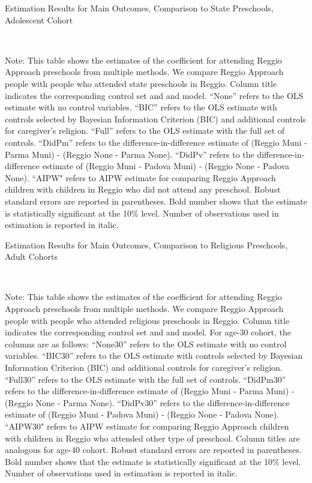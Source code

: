\begin{table}[H] \caption{Estimation Results for Main Outcomes, Comparison to State Preschools, Adolescent Cohort} \label{ols-M-adol-reg-stat}
\scalebox{0.8}{}
\vspace{1ex} \\
\footnotesize\raggedright{Note: This table shows the estimates of the coefficient for attending Reggio Approach preschools from multiple methods. We compare Reggio Approach people with people who attended state preschools in Reggio. Column title indicates the corresponding control set and and model. ``None'' refers to the OLS estimate with no control variables. ``BIC'' refers to the OLS estimate with controls selected by Bayesian Information Criterion (BIC) and additional controls for caregiver's religion. ``Full'' refers to the OLS estimate with the full set of controls. ``DidPm'' refers to the difference-in-difference estimate of (Reggio Muni - Parma Muni) - (Reggio None - Parma None). ``DidPv'' refers to the difference-in-difference estimate of (Reggio Muni - Padova Muni) - (Reggio None - Padova None).  ``AIPW" refers to AIPW estimate for comparing Reggio Approach children with children in Reggio who did not attend any preschool. Robust standard errors are reported in parentheses. Bold number shows that the estimate is statistically significant at the 10\% level. Number of observations used in estimation is reported in italic.}
\end{table}




\begin{table}[H] \caption{Estimation Results for Main Outcomes, Comparison to Religious Preschools, Adult Cohorts} \label{ols-M-adult-reg-reli}
\scalebox{0.75}{}
\vspace{1ex} \\
\footnotesize\raggedright{Note: This table shows the estimates of the coefficient for attending Reggio Approach preschools from multiple methods. We compare Reggio Approach people with people who attended religious preschools in Reggio.  Column title indicates the corresponding control set and and model. For age-30 cohort, the columns are as follows: ``None30'' refers to the OLS estimate with no control variables. ``BIC30'' refers to the OLS estimate with controls selected by Bayesian Information Criterion (BIC) and additional controls for caregiver's religion. ``Full30'' refers to the OLS estimate with the full set of controls. ``DidPm30'' refers to the difference-in-difference estimate of (Reggio Muni - Parma Muni) - (Reggio None - Parma None). ``DidPv30'' refers to the difference-in-difference estimate of (Reggio Muni - Padova Muni) - (Reggio None - Padova None).  ``AIPW30" refers to AIPW estimate for comparing Reggio Approach children with children in Reggio who attended other type of preschool. Column titles are analogous for age-40 cohort. Robust standard errors are reported in parentheses. Bold number shows that the estimate is statistically significant at the 10\% level. Number of observations used in estimation is reported in italic.}
\end{table}

